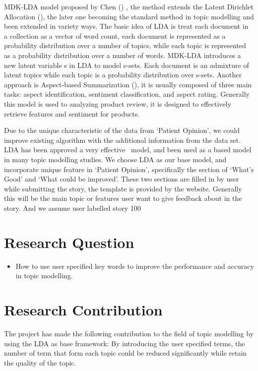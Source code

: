 \documentclass[11pt,twoside]{report}
\begin{document}
MDK-LDA model proposed by Chen (\cite{ref24}) , the method extends the Latent Dirichlet Allocation (\cite{ref25}), the later one becoming the standard method in topic modelling and been extended in variety ways. The basic idea of LDA is treat each document in a collection as a vector of word count, each document is represented as a probability distribution over a number of topics, while each topic is represented as a probability distribution over a number of words. MDK-LDA introduces a new latent variable s in LDA to model s-sets. Each document is an admixture of latent topics while each topic is a probability distribution over s-sets. Another approach is Aspect-based Summarization (\cite{ref11}), it is usually composed of three main tasks: aspect identification, sentiment classification, and aspect rating. Generally this model is used to analyzing product review, it is designed to effectively retrieve features and sentiment for products.

Due to the unique characteristic of the data from ‘Patient Opinion’, we could improve existing algorithm with the additional information from the data set. LDA has been approved a very effective  model, and been used as a based model in many topic modelling studies. We choose LDA as our base model, and incorporate unique feature in ‘Patient Opinion’, specifically the section of ‘What’s Good’ and ‘What could be improved’. These two sections are filled in by user while submitting the story, the template is provided by the website. Generally this will be the main topic or features user want to give feedback about in the story. And we assume user labelled story 100%
\section{Research Question}
\begin{itemize}
\item How to use user specified key words to improve the performance and accuracy in topic modelling.
\end{itemize}

\section{Research Contribution}
The project has made the following contribution to the field of topic modelling by using the LDA as base framework:
By introducing the user specified terms, the number of term that form each topic could be reduced significantly while retain the quality of the topic.
\end{document}
